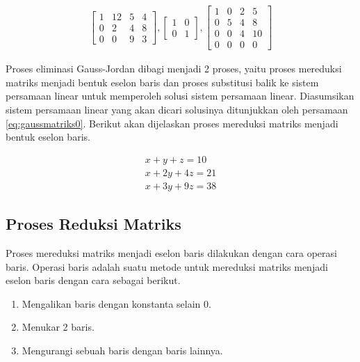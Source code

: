 \begin{center}
	\setlength\arraycolsep{10pt}
	\begin{gather}
		\begin{bmatrix}
				1 	& 12 	& 5 	& 4 		\\[1em]
				0 	& 2 	& 4 	& 8 		\\[1em]
				0 	& 0 	& 9 	& 3
		\end{bmatrix},
		\begin{bmatrix}
				1 & 0 	\\[1em]
				0 & 1
		\end{bmatrix},
		\begin{bmatrix}
				1 	& 0 	& 2 	& 5 		\\[1em]
				0 	& 5 	& 4 	& 8 		\\[1em]
				0 	& 0 	& 4 	& 10		\\[1em]
				0 	& 0 	& 0 	& 0
		\end{bmatrix} \label{eq:gaussmatriks1}
	\end{gather}
\end{center}

Proses eliminasi Gauss-Jordan dibagi menjadi 2 proses, yaitu proses mereduksi matriks menjadi bentuk eselon baris dan proses substitusi balik ke sistem persamaan linear untuk memperoleh solusi sistem persamaan linear. Diasumsikan sistem persamaan linear yang akan dicari solusinya ditunjukkan oleh persamaan \ref{eq:gaussmatriks0}. Berikut akan dijelaskan proses mereduksi matriks menjadi bentuk eselon baris.

\begin{gather}
	x + y + z = 10 \nonumber \\
	x + 2y + 4z = 21 \label{eq:gaussmatriks0} \\
	x + 3y + 9z = 38 \nonumber
\end{gather}

\subsection{Proses Reduksi Matriks}

Proses mereduksi matriks menjadi eselon baris dilakukan dengan cara operasi baris. Operasi baris adalah suatu metode untuk mereduksi matriks menjadi eselon baris dengan cara sebagai berikut.

\begin{enumerate}
	\item Mengalikan baris dengan konstanta selain 0.
	\item Menukar 2 baris.
	\item Mengurangi sebuah baris dengan baris lainnya.
\end{enumerate}

